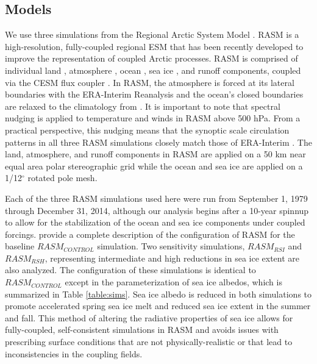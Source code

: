 \subsection{Models}
\label{sec:models}
We use three simulations from the Regional Arctic System Model \citep[RASM; ][]{Hamman_2016a,Roberts_2015a}.
RASM is a high-resolution, fully-coupled regional ESM that has been recently developed to improve the representation of coupled Arctic processes.
RASM is comprised of individual land \citep[see ][]{Hamman_2016a}, atmosphere \citep[see ][]{Cassano_2016}, ocean \citep[see ][]{Roberts_2015a}, sea ice \citep[see ][]{Roberts_2015a}, and runoff \citep[see ][]{Hamman_2016b} components, coupled via the CESM flux coupler \citet{Craig_2012}.
In RASM, the atmosphere is forced at its lateral boundaries with the ERA-Interim Reanalysis \citep{Dee_2011} and the ocean's closed boundaries are relaxed to the climatology from \citet{Steele_2001}.
It is important to note that spectral nudging is applied to temperature and winds in RASM above 500 hPa.
From a practical perspective, this nudging means that the synoptic scale circulation patterns in all three RASM simulations closely match those of ERA-Interim \citep{Glisan_2013}.
The land, atmosphere, and runoff components in RASM are applied on a 50 km near equal area polar stereographic grid while the ocean and sea ice are applied on a 1/12$^{\circ}$ rotated pole mesh.

Each of the three RASM simulations used here were run from September 1, 1979 through December 31, 2014, although our analysis begins after a 10-year spinnup to allow for the stabilization of the ocean and sea ice components under coupled forcings.
\citet{Hamman_2016b} provide a complete description of the configuration of RASM for the baseline $RASM_{CONTROL}$ simulation.
Two sensitivity simulations, $RASM_{RSI}$ and $RASM_{RSH}$, representing intermediate and high reductions in sea ice extent are also analyzed.
The configuration of these simulations is identical to $RASM_{CONTROL}$ except in the parameterization of sea ice albedos, which is summarized in Table \ref{table:sims}.
Sea ice albedo is reduced in both simulations to promote accelerated spring sea ice melt and reduced sea ice extent in the summer and fall.
This method of altering the radiative properties of sea ice allows for fully-coupled, self-consistent simulations in RASM and avoids issues with prescribing surface conditions that are not physically-realistic or that lead to inconsistencies in the coupling fields.

